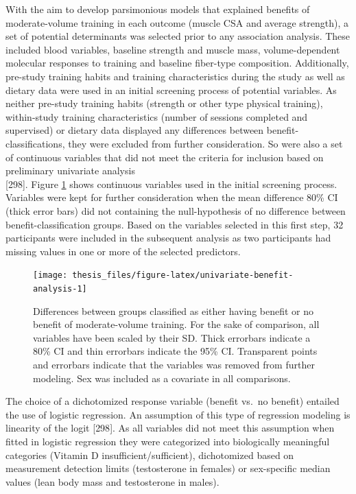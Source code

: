 \documentclass[twoside,10pt]{gihclass} %
\begin{document}
With the aim to develop parsimonious models that explained benefits of moderate-volume training in each outcome (muscle CSA and average strength), a set of potential determinants was selected prior to any association analysis. These included blood variables, baseline strength and muscle mass, volume-dependent molecular responses to training and baseline fiber-type composition. Additionally, pre-study training habits and training characteristics during the study as well as dietary data were used in an initial screening process of potential variables. As neither pre-study training habits (strength or other type physical training), within-study training characteristics (number of sessions completed and supervised) or dietary data displayed any differences between benefit-classifications, they were excluded from further consideration. So were also a set of continuous variables that did not meet the criteria for inclusion based on preliminary univariate analysis\\
{[}298{]}.
Figure \ref{fig:univariate-benefit-analysis} shows continuous variables used in the initial screening process. Variables were kept for further consideration when the mean difference 80\% CI (thick error bars) did not containing the null-hypothesis of no difference between benefit-classification groups. Based on the variables selected in this first step, 32 participants were included in the subsequent analysis as two participants had missing values in one or more of the selected predictors.
\begin{figure}

{\centering \texttt{[image: thesis\_files/figure-latex/univariate-benefit-analysis-1]} 

}

\caption[Univariate analysis of potential determinants of benefit to moderat- over low-volume training]{Differences between groups classified as either having benefit or no benefit of moderate-volume training. For the sake of comparison, all variables have been scaled by their SD. Thick errorbars indicate a 80\% CI and thin errorbars indicate the 95\% CI. Transparent points and errorbars indicate that the variables was removed from further modeling. Sex was included as a covariate in all comparisons.}\label{fig:univariate-benefit-analysis}
\end{figure}
The choice of a dichotomized response variable (benefit vs.~no benefit) entailed the use of logistic regression. An assumption of this type of regression modeling is linearity of the logit
{[}298{]}.
As all variables did not meet this assumption when fitted in logistic regression they were categorized into biologically meaningful categories (Vitamin D insufficient/sufficient), dichotomized based on measurement detection limits (testosterone in females) or sex-specific median values (lean body mass and testosterone in males).
\end{document}
